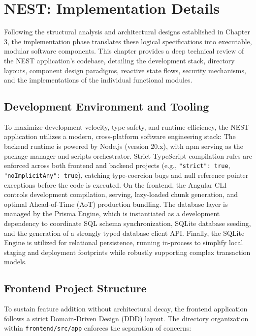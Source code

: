 \chapter{NEST: Implementation Details}
\label{chap:implementation-details}

Following the structural analysis and architectural designs established in Chapter 3, the implementation phase translates these logical specifications into executable, modular software components. This chapter provides a deep technical review of the NEST application's codebase, detailing the development stack, directory layouts, component design paradigms, reactive state flows, security mechanisms, and the implementations of the individual functional modules.

\section{Development Environment and Tooling}
To maximize development velocity, type safety, and runtime efficiency, the NEST application utilizes a modern, cross-platform software engineering stack:
The backend runtime is powered by Node.js (version 20.x), with npm serving as the package manager and scripts orchestrator. Strict TypeScript compilation rules are enforced across both frontend and backend projects (e.g., \texttt{"strict": true}, \texttt{"noImplicitAny": true}), catching type-coercion bugs and null reference pointer exceptions before the code is executed. On the frontend, the Angular CLI controls development compilation, serving, lazy-loaded chunk generation, and optimal Ahead-of-Time (AoT) production bundling. The database layer is managed by the Prisma Engine, which is instantiated as a development dependency to coordinate SQL schema synchronization, SQLite database seeding, and the generation of a strongly typed database client API. Finally, the SQLite Engine is utilized for relational persistence, running in-process to simplify local staging and deployment footprints while robustly supporting complex transaction models.

\section{Frontend Project Structure}
To sustain feature addition without architectural decay, the frontend application follows a strict Domain-Driven Design (DDD) layout. The directory organization within \texttt{frontend/src/app} enforces the separation of concerns:

